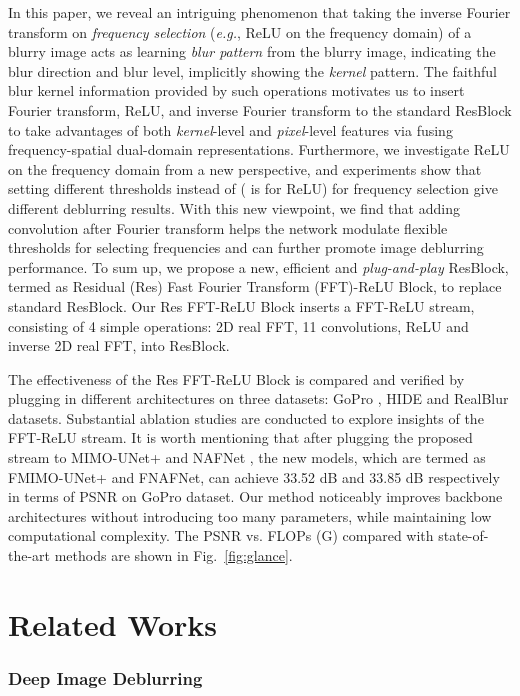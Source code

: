 \documentclass[letterpaper]{article} \usepackage{aaai23}  \usepackage{times}  \usepackage{helvet}  \usepackage{courier}  \usepackage[hyphens]{url}  \usepackage{graphicx} \usepackage{enumitem}
\begin{document}
In this paper, we reveal an intriguing phenomenon that taking the {inverse Fourier transform} on \emph{frequency selection} (\emph{e.g.}, ReLU on the frequency domain) of a blurry image acts as learning \emph{blur pattern} from the blurry image, indicating the blur direction and blur level, implicitly showing the \emph{kernel} pattern. The faithful blur kernel information provided by such operations motivates us to insert Fourier transform, ReLU, and inverse Fourier transform to the standard ResBlock to take advantages of both \emph{kernel}-level and \emph{pixel}-level features via fusing frequency-spatial dual-domain representations. Furthermore, we investigate ReLU on the frequency domain from a new perspective, and experiments show that setting different thresholds instead of  ( is for ReLU) for frequency selection give different deblurring results. With this new viewpoint, we find that adding convolution after Fourier transform helps
the network modulate flexible thresholds for selecting frequencies and can further promote image deblurring performance. To sum up, we propose a new, efficient and \emph{plug-and-play} ResBlock, termed as Residual (Res) Fast Fourier Transform (FFT)-ReLU Block, to replace standard ResBlock. Our Res FFT-ReLU Block inserts a FFT-ReLU stream, consisting of 4 simple operations: 2D real FFT, 11 convolutions, ReLU and inverse 2D real FFT, into ResBlock.

The effectiveness of the Res FFT-ReLU Block is compared and verified by plugging in different architectures on three datasets: GoPro \cite{Nah2017deep}, HIDE \cite{Shen2019human} and RealBlur \cite{Rim2020real} datasets. Substantial ablation studies are conducted to explore insights of the  FFT-ReLU stream. It is worth mentioning that after plugging the proposed stream to MIMO-UNet+ \cite{Cho2021rethinking} and NAFNet \cite{Chen2022simple}, the new models, which are termed as FMIMO-UNet+ and FNAFNet, can achieve 33.52 dB and 33.85 dB respectively in terms of PSNR on GoPro dataset. Our method noticeably improves backbone architectures without introducing too many parameters, while maintaining low computational complexity. The PSNR vs. FLOPs (G) compared with state-of-the-art methods are shown in Fig.~\ref{fig:glance}.

\section{Related Works}
\label{sec:relatedworks}
\subsubsection{Deep Image Deblurring}
\end{document}
